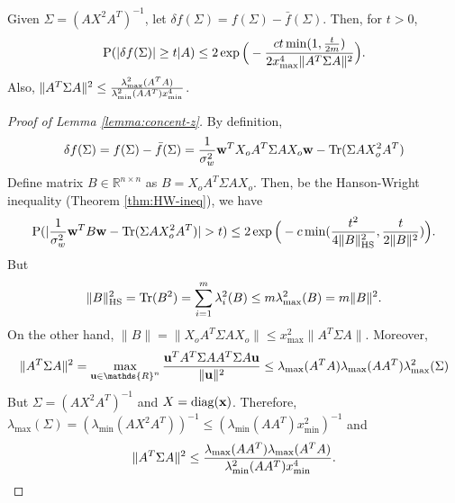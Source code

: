 \documentclass[onecolumn]{IEEEtran}
\newcommand{\wv}{{\bf w}}
\begin{document}
\begin{lemma}\label{lemma:concent-z}
Given $\Sigma=(AX^2A^T)^{-1}$, let $\delta f({\Sigma})={f}({\Sigma})-\bar{f}({\Sigma})$. Then, for $t>0$, 
\[
\P(|\delta f(\Sigma)|\geq t|A)\leq  2\exp\Big(-{ct\min(1,{t\over 2m  }) \over 2 x_{\max}^4\|A^T\Sigma A\|^2}\Big).
\]
Also, $\|A^T\Sigma A\|^2\leq {\lambda^2_{\max}(A^TA)\over \lambda^2_{\min}(AA^T) x^4_{\min}}$. 
\end{lemma}


\begin{proof}[Proof of Lemma \ref{lemma:concent-z}]
By definition, 
\[
\delta f({\Sigma})={f}({\Sigma})-\bar{f}({\Sigma})={1\over \sigma_w^2}\wv^TX_oA^T\Sigma AX_o\wv-{\rm Tr}(\Sigma AX_o^2A^T)
\]
Define matrix $B\in\mathds{R}^{n\times n}$ as  $B=X_oA^T\Sigma AX_o$. Then, be the Hanson-Wright inequality (Theorem \ref{thm:HW-ineq}), we have 
\begin{align}
\P(|{1\over \sigma_w^2}\wv^TB\wv- {\rm Tr}(\Sigma AX_o^2A^T)|>t)\leq 2\exp\Big(-c\min({t^2\over 4\|B\|_{\rm HS}^2 },{t \over 2\|B\|^2 })\Big).
\end{align}
But
\begin{align}
\|B\|_{\rm HS}^2={\rm Tr}(B^2)=\sum_{i=1}^m\lambda_i^2(B)\leq m\lambda^2_{\max}(B)=m\|B\|^2.
\end{align}
On the other hand, $\| B\|=\|X_oA^T\Sigma AX_o\|\leq x^2_{\max}\|A^T\Sigma A\|$. Moreover,
\begin{align}
\|A^T\Sigma A\|^2 =\max_{\uv\in\mathds{R}^n}{ \uv^T A^T \Sigma A A^T\Sigma A\uv \over \|\uv\|^2}\leq \lambda_{\max}(A^TA)\lambda_{\max}(AA^T)\lambda_{\max}^2(\Sigma)
\end{align}
But $\Sigma=(AX^2A^T)^{-1}$ and $X={\rm diag}(\xv)$.  Therefore, $\lambda_{\max}(\Sigma)=(\lambda_{\min}(AX^2A^T))^{-1}\leq (\lambda_{\min}(AA^T)x^2_{\min})^{-1}$ and
\begin{align}
\|A^T\Sigma A\|^2\leq {\lambda_{\max}(AA^T)\lambda_{\max}(A^TA)\over \lambda^2_{\min}(AA^T) x^4_{\min}}.
\end{align}

\end{proof}
\end{document}
